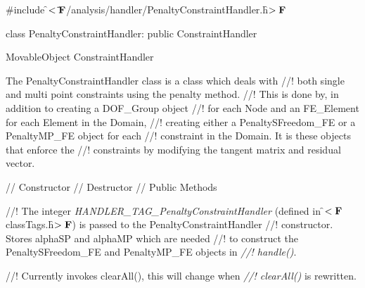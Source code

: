 
\indent \#include \f$<\tilde{
}{\bf F}$/analysis/handler/PenaltyConstraintHandler.h\f$>{\bf F}$ 

\indent class PenaltyConstraintHandler: public ConstraintHandler

\indent MovableObject
\indent\indent ConstraintHandler
\indent\indent{}

\indent The PenaltyConstraintHandler class is a class which deals with
//! both single and multi point constraints using the penalty method. 
//! This is done by, in addition to creating a DOF\_Group object
//! for each Node and an FE\_Element for each Element in the Domain,
//! creating either a PenaltySFreedom\_FE or a PenaltyMP\_FE object for each
//! constraint in the Domain. It is these objects that enforce the
//! constraints by modifying the tangent matrix and residual vector. 


\indent // Constructor
\indent // Destructor
\indent // Public Methods


//! The integer {\em HANDLER\_TAG\_PenaltyConstraintHandler} (defined in
\f$<{\bf F}$classTags.h\f$>{\bf F}$) is passed to the PenaltyConstraintHandler
//! constructor. Stores \p alphaSP and \p alphaMP which are needed
//! to construct the PenaltySFreedom\_FE and PenaltyMP\_FE objects in {\em
//! handle()}.

//! Currently invokes clearAll(), this will change when {\em
//! clearAll()} is rewritten.

